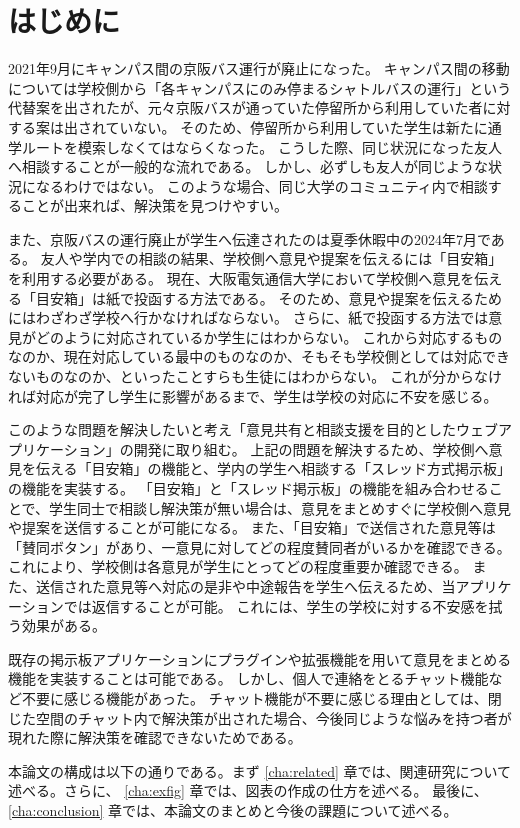 \documentclass[main]{subfiles}
\begin{document}
\chapter{はじめに}
\label{cha:intro}

2021年9月にキャンパス間の京阪バス運行が廃止になった。
キャンパス間の移動については学校側から「各キャンパスにのみ停まるシャトルバスの運行」という代替案を出されたが、元々京阪バスが通っていた停留所から利用していた者に対する案は出されていない。
そのため、停留所から利用していた学生は新たに通学ルートを模索しなくてはならくなった。
こうした際、同じ状況になった友人へ相談することが一般的な流れである。
しかし、必ずしも友人が同じような状況になるわけではない。
このような場合、同じ大学のコミュニティ内で相談することが出来れば、解決策を見つけやすい。

また、京阪バスの運行廃止が学生へ伝達されたのは夏季休暇中の2024年7月である。
友人や学内での相談の結果、学校側へ意見や提案を伝えるには「目安箱」を利用する必要がある。
現在、大阪電気通信大学において学校側へ意見を伝える「目安箱」は紙で投函する方法である。
そのため、意見や提案を伝えるためにはわざわざ学校へ行かなければならない。
さらに、紙で投函する方法では意見がどのように対応されているか学生にはわからない。
これから対応するものなのか、現在対応している最中のものなのか、そもそも学校側としては対応できないものなのか、といったことすらも生徒にはわからない。
これが分からなければ対応が完了し学生に影響があるまで、学生は学校の対応に不安を感じる。

このような問題を解決したいと考え「意見共有と相談支援を目的としたウェブアプリケーション」の開発に取り組む。
上記の問題を解決するため、学校側へ意見を伝える「目安箱」の機能と、学内の学生へ相談する「スレッド方式掲示板」の機能を実装する。
「目安箱」と「スレッド掲示板」の機能を組み合わせることで、学生同士で相談し解決策が無い場合は、意見をまとめすぐに学校側へ意見や提案を送信することが可能になる。
また、「目安箱」で送信された意見等は「賛同ボタン」があり、一意見に対してどの程度賛同者がいるかを確認できる。
これにより、学校側は各意見が学生にとってどの程度重要か確認できる。
また、送信された意見等へ対応の是非や中途報告を学生へ伝えるため、当アプリケーションでは返信することが可能。
これには、学生の学校に対する不安感を拭う効果がある。

既存の掲示板アプリケーションにプラグインや拡張機能を用いて意見をまとめる機能を実装することは可能である。
しかし、個人で連絡をとるチャット機能など不要に感じる機能があった。
チャット機能が不要に感じる理由としては、閉じた空間のチャット内で解決策が出された場合、今後同じような悩みを持つ者が現れた際に解決策を確認できないためである。

本論文の構成は以下の通りである。まず \ref{cha:related} 章では、関連研究について述べる。さらに、
\ref{cha:exfig} 章では、図表の作成の仕方を述べる。
最後に、\ref{cha:conclusion} 章では、本論文のまとめと今後の課題について述べる。
\end{document}
